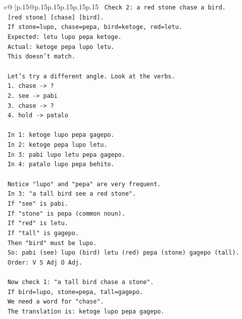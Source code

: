 \documentclass{article}
\begin{document}
{\begin{supertabular}{c@{$\;$}|p{.15\linewidth}@{}p{.15\linewidth}p{.15\linewidth}p{.15\linewidth}p{.15\linewidth}p{.15\linewidth}}
{{{\texttt{      Check 2: a red stone chase a bird.} \\
\texttt{      {[}red stone{]} {[}chase{]} {[}bird{]}.} \\
\texttt{      If stone=lupo, chase=pepa, bird=ketoge, red=letu.} \\
\texttt{      Expected: letu lupo pepa ketoge.} \\
\texttt{      Actual: ketoge pepa lupo letu.} \\
\texttt{      This doesn't match.} \\
\\ 
\texttt{   Let's try a different angle. Look at the verbs.} \\
\texttt{   1. chase {-}> ?} \\
\texttt{   2. see {-}> pabi} \\
\texttt{   3. chase {-}> ?} \\
\texttt{   4. hold {-}> patalo} \\
\\ 
\texttt{   In 1: ketoge lupo pepa gagepo.} \\
\texttt{   In 2: ketoge pepa lupo letu.} \\
\texttt{   In 3: pabi lupo letu pepa gagepo.} \\
\texttt{   In 4: patalo lupo pepa behito.} \\
\\ 
\texttt{   Notice "lupo" and "pepa" are very frequent.} \\
\texttt{   In 3: "a tall bird see a red stone".} \\
\texttt{   If "see" is pabi.} \\
\texttt{   If "stone" is pepa (common noun).} \\
\texttt{   If "red" is letu.} \\
\texttt{   If "tall" is gagepo.} \\
\texttt{   Then "bird" must be lupo.} \\
\texttt{   So: pabi (see) lupo (bird) letu (red) pepa (stone) gagepo (tall).} \\
\texttt{   Order: V S Adj O Adj.} \\
\\ 
\texttt{   Now check 1: "a tall bird chase a stone".} \\
\texttt{   If bird=lupo, stone=pepa, tall=gagepo.} \\
\texttt{   We need a word for "chase".} \\
\texttt{   The translation is: ketoge lupo pepa gagepo.} \\
}}}
\end{supertabular}}
\end{document}
